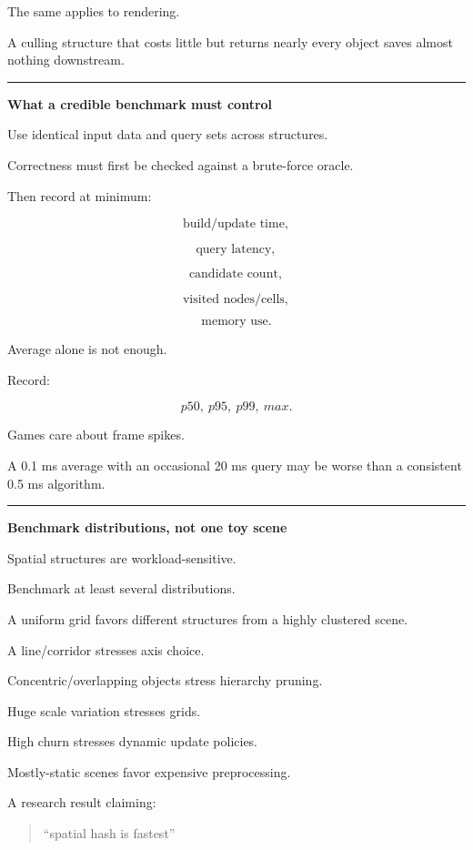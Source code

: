 The same applies to rendering.

A culling structure that costs little but returns nearly every object saves almost nothing downstream.

\begin{center}\rule{0.5\linewidth}{0.5pt}\end{center}

\textbf{What a credible benchmark must control}

Use identical input data and query sets across structures.

Correctness must first be checked against a brute-force oracle.

Then record at minimum:

\[
\text{build/update time},
\]

\[
\text{query latency},
\]

\[
\text{candidate count},
\]

\[
\text{visited nodes/cells},
\]

\[
\text{memory use}.
\]

Average alone is not enough.

Record:

\[
p50,\ p95,\ p99,\ max.
\]

Games care about frame spikes.

A 0.1 ms average with an occasional 20 ms query may be worse than a consistent 0.5 ms algorithm.

\begin{center}\rule{0.5\linewidth}{0.5pt}\end{center}

\textbf{Benchmark distributions, not one toy scene}

Spatial structures are workload-sensitive.

Benchmark at least several distributions.

A uniform grid favors different structures from a highly clustered scene.

A line/corridor stresses axis choice.

Concentric/overlapping objects stress hierarchy pruning.

Huge scale variation stresses grids.

High churn stresses dynamic update policies.

Mostly-static scenes favor expensive preprocessing.

A research result claiming:

\begin{quote}
``spatial hash is fastest''
\end{quote}


